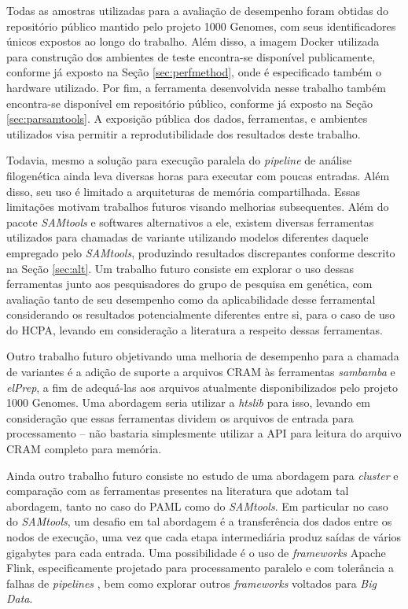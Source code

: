\documentclass[cic,tc]{iiufrgs}
\begin{document}
Todas as amostras utilizadas para a avaliação de desempenho foram obtidas do
repositório público mantido pelo projeto 1000 Genomes, com seus identificadores
únicos expostos ao longo do trabalho. Além disso, a imagem Docker utilizada
para construção dos ambientes de teste encontra-se disponível publicamente,
conforme já exposto na Seção \ref{sec:perfmethod}, onde é especificado também o
hardware utilizado. Por fim, a ferramenta desenvolvida nesse trabalho também
encontra-se disponível em repositório público, conforme já exposto na Seção
\ref{sec:parsamtools}. A exposição pública dos dados, ferramentas, e ambientes
utilizados visa permitir a reprodutibilidade dos resultados deste trabalho.

Todavia, mesmo a solução para execução paralela do \textit{pipeline} de análise
filogenética ainda leva diversas horas para executar com poucas entradas. Além
disso, seu uso é limitado a arquiteturas de memória compartilhada. Essas
limitações motivam trabalhos futuros visando melhorias subsequentes. Além do
pacote \textit{SAMtools} e softwares alternativos a ele, existem diversas
ferramentas utilizados para chamadas de variante utilizando modelos diferentes
daquele empregado pelo \textit{SAMtools}, produzindo resultados discrepantes
conforme descrito na Seção \ref{sec:alt}. Um trabalho futuro consiste em
explorar o uso dessas ferramentas junto aos pesquisadores do grupo de pesquisa
em genética, com avaliação tanto de seu desempenho como da aplicabilidade desse
ferramental considerando os resultados potencialmente diferentes entre si, para
o caso de uso do HCPA, levando em consideração a literatura a respeito dessas
ferramentas.

Outro trabalho futuro objetivando uma melhoria de desempenho para a chamada de
variantes é a adição de suporte a arquivos CRAM às ferramentas
\textit{sambamba} e \textit{elPrep}, a fim de adequá-las aos arquivos
atualmente disponibilizados pelo projeto 1000 Genomes. Uma abordagem seria
utilizar a \textit{htslib} para isso, levando em consideração que essas ferramentas
dividem os arquivos de entrada para processamento -- não bastaria simplesmente
utilizar a API para leitura do arquivo CRAM completo para memória.

Ainda outro trabalho futuro consiste no estudo de uma abordagem para
\textit{cluster} e comparação com as ferramentas presentes na literatura que
adotam tal abordagem, tanto no caso do PAML como do \textit{SAMtools}. Em particular no
caso do \textit{SAMtools}, um desafio em tal abordagem é a transferência dos dados entre
os nodos de execução, uma vez que cada etapa intermediária produz saídas de
vários gigabytes para cada entrada. Uma possibilidade é o uso de
\textit{frameworks} Apache Flink, especificamente projetado para processamento
paralelo e com tolerância a falhas de \textit{pipelines}
\cite{carbone2015apache}, bem como explorar outros \textit{frameworks} voltados
para \textit{Big Data}.
\end{document}
